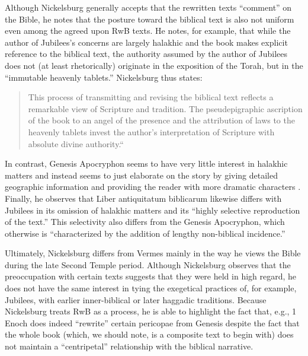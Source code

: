 Although Nickelsburg generally accepts that the rewritten texts
``comment'' on the Bible, he notes that the posture toward the biblical
text is also not uniform even among the agreed upon RwB texts. He notes,
for example, that while the author of Jubilees's concerns are largely
halakhic and the book makes explicit reference to the biblical text, the
authority assumed by the author of Jubilees does not (at least
rhetorically) originate in the exposition of the Torah, but in the
``immutable heavenly
tablets.''\autocite[100--101]{nickelsburg_stone1984} Nickelsburg thus
states:

\begin{quote}
This process of transmitting and revising the biblical text reflects a
remarkable view of Scripture and tradition. The pseudepigraphic
ascription of the book to an angel of the presence and the attribution
of laws to the heavenly tablets invest the author's interpretation of
Scripture with absolute divine
authority.``\autocite[101]{nickelsburg_stone1984}
\end{quote}

In contrast, Genesis Apocryphon seems to have very little interest in
halakhic matters and instead seems to just elaborate on the story by
giving detailed geographic information and providing the reader with
more dramatic characters \autocite[106]{nickelsburg_stone1984}. Finally,
he observes that Liber antiquitatum biblicarum likewise differs with
Jubilees in its omission of halakhic matters and its ``highly selective
reproduction of the text.''\autocite[110]{nickelsburg_stone1984} This
selectivity also differs from the Genesis Apocryphon, which otherwise is
``characterized by the addition of lengthy non-biblical
incidence.''\autocite[110]{nickelsburg_stone1984}

Ultimately, Nickelsburg differs from Vermes mainly in the way he views
the Bible during the late Second Temple period. Although Nickelsburg
observes that the preoccupation with certain texts suggests that they
were held in high regard, he does not have the same interest in tying
the exegetical practices of, for example, Jubilees, with earlier
inner-biblical or later haggadic traditions. Because Nickelsburg treats
RwB as a process, he is able to highlight the fact that, e.g., 1 Enoch
does indeed ``rewrite'' certain pericopae from Genesis despite the fact
that the whole book (which, we should note, is a composite text to begin
with) does not maintain a ``centripetal'' relationship with the biblical
narrative.

